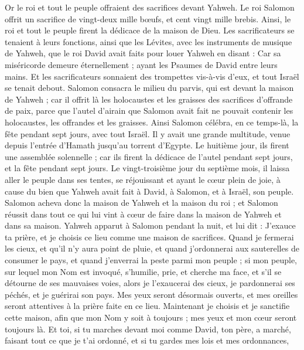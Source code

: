 \begin{multicols}{2}
Or le roi et tout le peuple offraient des sacrifices devant Yahweh.
Le roi Salomon offrit un sacrifice de vingt-deux mille bœufs, et cent vingt mille brebis. Ainsi, le roi et tout le peuple firent la dédicace de la maison de Dieu.
Les sacrificateurs se tenaient à leurs fonctions, ainsi que les Lévites, avec les instruments de musique de Yahweh, que le roi David avait faits pour louer Yahweh en disant : Car sa miséricorde demeure éternellement ; ayant les Psaumes de David entre leurs mains. Et les sacrificateurs sonnaient des trompettes vis-à-vis d'eux, et tout Israël se tenait debout.
Salomon consacra le milieu du parvis, qui est devant la maison de Yahweh ; car il offrit là les holocaustes et les graisses des sacrifices d'offrande de paix, parce que l'autel d'airain que Salomon avait fait ne pouvait contenir les holocaustes, les offrandes et les graisses.
Ainsi Salomon célébra, en ce temps-là, la fête pendant sept jours, avec tout Israël. Il y avait une grande multitude, venue depuis l'entrée d'Hamath jusqu'au torrent d'Egypte.
Le huitième jour, ils firent une assemblée solennelle ; car ils firent la dédicace de l'autel pendant sept jours, et la fête pendant sept jours.
Le vingt-troisième jour du septième mois, il laissa aller le peuple dans ses tentes, se réjouissant et ayant le cœur plein de joie, à cause du bien que Yahweh avait fait à David, à Salomon, et à Israël, son peuple.
Salomon acheva donc la maison de Yahweh et la maison du roi ; et Salomon réussit dans tout ce qui lui vint à cœur de faire dans la maison de Yahweh et dans sa maison.
Yahweh apparut à Salomon pendant la nuit, et lui dit : J'exauce ta prière, et je choisis ce lieu comme une maison de sacrifices.
Quand je fermerai les cieux, et qu'il n'y aura point de pluie, et quand j'ordonnerai aux sauterelles de consumer le pays, et quand j'enverrai la peste parmi mon peuple ;
si mon peuple, sur lequel mon Nom est invoqué, s'humilie, prie, et cherche ma face, et s'il se détourne de ses mauvaises voies, alors je l'exaucerai des cieux, je pardonnerai ses péchés, et je guérirai son pays.
Mes yeux seront désormais ouverts, et mes oreilles seront attentives à la prière faite en ce lieu.
Maintenant je choisis et je sanctifie cette maison, afin que mon Nom y soit à toujours ; mes yeux et mon cœur seront toujours là.
Et toi, si tu marches devant moi comme David, ton père, a marché, faisant tout ce que je t'ai ordonné, et si tu gardes mes lois et mes ordonnances,

\end{multicols}
